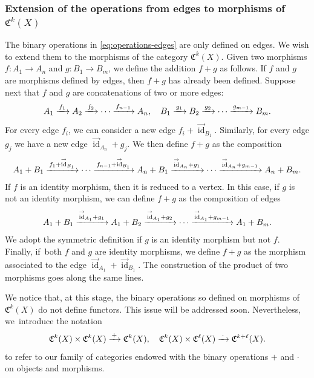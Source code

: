 \documentclass[11pt]{article}
\newcommand\To[1]{\mathchoice{\xrightarrow{\kern1pt#1\kern1pt}}{\stackrel{#1}{\longrightarrow}}{}{}}
\theoremstyle{plain}
\theoremstyle{definition}
\newcommand{\Cfrak}{\mathfrak C}
\DeclareMathOperator{\id}{id}
\begin{document}
\subsubsection*{Extension of the operations from edges to morphisms of $\Cfrak^{k}(X)$} The binary operations in \eqref{eq:operations-edges} are only defined on edges. We wish to extend them to the morphisms of the category $\Cfrak^{k}(X)$. Given two morphisms $f\colon A_{1}\to A_{n}$ and $g\colon B_{1}\to B_{m}$, we define the addition $f + g$ as follows. If $f$ and $g$ are morphisms defined by edges, then $f+g$ has already been defined. Suppose next that $f$ and $g$ are concatenations of two or more edges:
\begin{displaymath}
A_{1}\To{f_{1}} A_{2}\To{f_{2}}\cdots\To{f_{n-1}} A_{n},\quad B_{1}\To{g_{1}}B_{2}\To{g_{2}}\cdots\To{g_{m-1}} B_{m}.
\end{displaymath}
For every edge $f_{i}$, we can consider a new edge $f_{i}+\overset{\to}{\id}_{B_{1}}$. Similarly, for every edge $g_{j}$ we have a new edge $\overset{\to}{\id}_{A_{n}}+g_{j}$. We then define $f+ g$ as the composition
\begin{displaymath}
\begin{split}
A_{1}+B_{1}\To{f_{1}+\overset{\to}{\id}_{B_{1}}} \cdots\To{f_{n-1}+\overset{\to}{\id}_{B_{1}}} A_{n}+B_{1}\To{\overset{\to}{\id}_{A_{n}}+g_{1}}\cdots\To{\overset{\to}{\id}_{A_{n}}+g_{m-1}} A_{n}+B_{m}.
\end{split}
\end{displaymath}
If $f$ is an identity morphism, then it is reduced to a vertex. In this case, if $g$ is not an identity morphism, we can define $f+ g$ as the composition of edges
\begin{displaymath}
A_{1}+B_{1}\To{\overset{\to}{\id}_{A_{1}}+g_{1}}A_{1}+B_{2}\To{\overset{\to}{\id}_{A_{1}}+g_{2}}\cdots\To{\overset{\to}{\id}_{A_{1}}+g_{m-1}}A_{1}+B_{m}.
\end{displaymath}
We adopt the symmetric definition if $g$ is an identity morphism but not $f$. Finally, if~both $f$ and $g$ are identity morphisms, we define $f+ g$ as the morphism associated to the edge $\overset{\to}{\id}_{A_{1}}+\overset{\to}{\id}_{B_{1}}$. The construction of the product of two morphisms goes along the same lines.

We notice that, at this stage, the binary operations so defined on morphisms of $\Cfrak^{k}(X)$ do not define functors. This issue will be addressed soon. Nevertheless, we~introduce the notation
\begin{equation}\label{eq:binary-operations-on-Ck}
\Cfrak^{k}(X)\times\Cfrak^{k}(X)\To{+}\Cfrak^{k}(X),\quad \Cfrak^{k}(X)\times\Cfrak^{\ell}(X)\To{\,\cdot\,}\Cfrak^{k+\ell}(X).
\end{equation}
to refer to our family of categories endowed with the binary operations $+$ and $\cdot$ on objects and morphisms.
\end{document}
